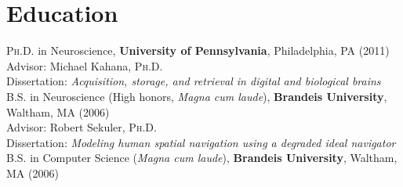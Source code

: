 \documentclass[11pt, a4paper]{article} %
\begin{document}

\section*{Education}

\textsc{Ph.D.} in Neuroscience, \textbf{University of Pennsylvania},
Philadelphia, PA (2011)\\
Advisor:  Michael Kahana, \textsc{Ph.D.}\\
Dissertation: \textit{Acquisition, storage, and
    retrieval in digital and biological brains}\\[.1cm]

\textsc{B.S.} in Neuroscience (High honors, \textit{Magna cum laude}), {\bf Brandeis University},
Waltham, MA (2006)\\
Advisor: Robert Sekuler, \textsc{Ph.D.}\\
Dissertation: \textit{Modeling human spatial navigation using a
    degraded ideal navigator}\\[0.05cm]

\textsc{B.S.} in Computer Science (\textit{Magna cum
  laude}), {\bf Brandeis University},
Waltham, MA (2006)

\end{document}
